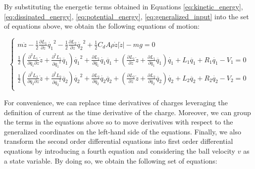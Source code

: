 By substituting the energetic terms obtained in Equations \ref{eq:kinetic_energy}, \ref{eq:dissipated_energy}, \ref{eq:potential_energy}, \ref{eq:generalized_input} into the set of equations above, we obtain the following equations of motion:

\begin{equation}
    \begin{cases}
        m \ddot{z} - \frac{1}{2} \frac{\partial L_1}{\partial z} \dot{q_1}^2 - \frac{1}{2} \frac{\partial L_2}{\partial z} \dot{q_2}^2 + \frac{1}{2} C_d A \rho \dot{z} |\dot{z}| - m g = 0                                                                                                                                                                                                            \\
        \frac{1}{2} \left( \frac{\partial^2 L_1}{\partial \dot{q_1} \partial z} \dot{z} + \frac{\partial^2 L_1}{\partial \dot{q_1}^2} \ddot{q_1} \right) \dot{q_1}^2 + \frac{\partial L_1}{\partial \dot{q_1}} \dot{q_1} \ddot{q_1} + \left( \frac{\partial L_1}{\partial z} \dot{z} + \frac{\partial L_1}{\partial \dot{q_1}} \ddot{q_1} \right) \dot{q_1} + L_1 \ddot{q_1} + R_1 \dot{q_1} - V_1 = 0 \\
        \frac{1}{2} \left( \frac{\partial^2 L_2}{\partial \dot{q_2} \partial z} \dot{z} + \frac{\partial^2 L_2}{\partial \dot{q_2}^2} \ddot{q_2} \right) \dot{q_2}^2 + \frac{\partial L_2}{\partial \dot{q_2}} \dot{q_2} \ddot{q_2} + \left( \frac{\partial L_2}{\partial z} \dot{z} + \frac{\partial L_2}{\partial \dot{q_2}} \ddot{q_2} \right) \dot{q_2} + L_2 \ddot{q_2} + R_2 \dot{q_2} - V_2 = 0 \\
    \end{cases}
\end{equation}

For convenience, we can replace time derivatives of charges leveraging the definition of current as the time derivative of the charge.
Moreover, we can group the terms in the equations above so to move derivatives with respect to the generalized coordinates on the left-hand side of the equations.
Finally, we also transform the second order differential equations into first order differential equations by introducing a fourth equation and considering the ball velocity $v$ as a state variable.
By doing so, we obtain the following set of equations:

